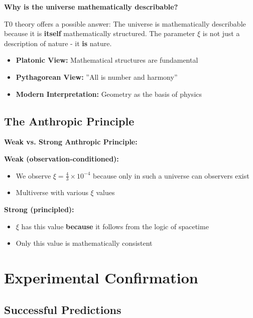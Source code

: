 	\begin{foundation}
		\textbf{Why is the universe mathematically describable?}
		
		T0 theory offers a possible answer: The universe is mathematically describable because it is \textbf{itself} mathematically structured. The parameter $\xi$ is not just a description of nature - it \textbf{is} nature.
		
		\begin{itemize}
			\item \textbf{Platonic View:} Mathematical structures are fundamental
			\item \textbf{Pythagorean View:} ''All is number and harmony''
			\item \textbf{Modern Interpretation:} Geometry as the basis of physics
		\end{itemize}
	\end{foundation}
	
	\subsection{The Anthropic Principle}
	
	\begin{alternative}
		\textbf{Weak vs. Strong Anthropic Principle:}
		
		\textbf{Weak (observation-conditioned):}
		\begin{itemize}
			\item We observe $\xi = \frac{4}{3} \times 10^{-4}$ because only in such a universe can observers exist
			\item Multiverse with various $\xi$ values
		\end{itemize}
		
		\textbf{Strong (principled):}
		\begin{itemize}
			\item $\xi$ has this value \textbf{because} it follows from the logic of spacetime
			\item Only this value is mathematically consistent
		\end{itemize}
	\end{alternative}
	
	\section{Experimental Confirmation}
	
	\subsection{Successful Predictions}
	
